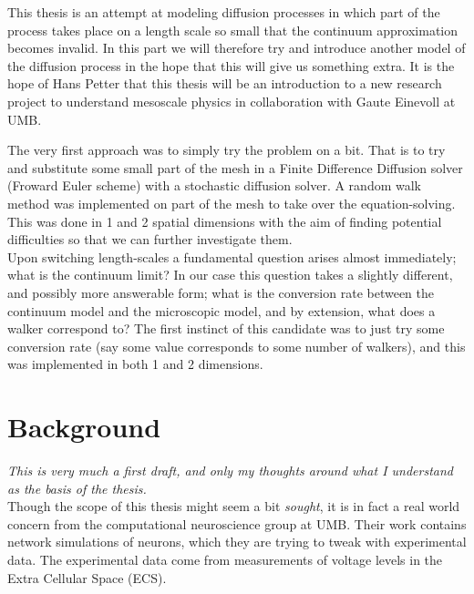This thesis is an attempt at modeling diffusion processes in which part of the process takes place on a length scale so small that the continuum approximation becomes invalid. 
In this part we will therefore try and introduce another model of the diffusion process in the hope that this will give us something extra. 
It is the hope of Hans Petter that this thesis will be an introduction to a new research project to understand mesoscale physics in collaboration with Gaute Einevoll at UMB.

The very first approach was to simply try the problem on a bit. That is to try and substitute some small part of the mesh in a Finite Difference Diffusion solver (Froward Euler scheme) with a stochastic diffusion solver. A random walk method was implemented on part of the mesh to take over the equation-solving. This was done in 1 and 2 spatial dimensions with the aim of finding potential difficulties so that we can further investigate them. \\
Upon switching length-scales a fundamental question arises almost immediately; what is the continuum limit? In our case this question takes a slightly different, and possibly more answerable form; what is the conversion rate between the continuum model and the microscopic model, and by extension, what does a walker correspond to?
The first instinct of this candidate was to just try some conversion rate (say some value corresponds to some number of walkers), and this was implemented in both 1 and 2 dimensions.

\section{Background}
\emph{This is very much a first draft, and only my thoughts around what I understand as the basis of the thesis.}\\
Though the scope of this thesis might seem a bit \emph{sought}, it is in fact a real world concern from the computational neuroscience group at UMB. 
Their work contains network simulations of neurons, which they are trying to tweak with experimental data. 
The experimental data come from measurements of voltage levels in the Extra Cellular Space (ECS). 

